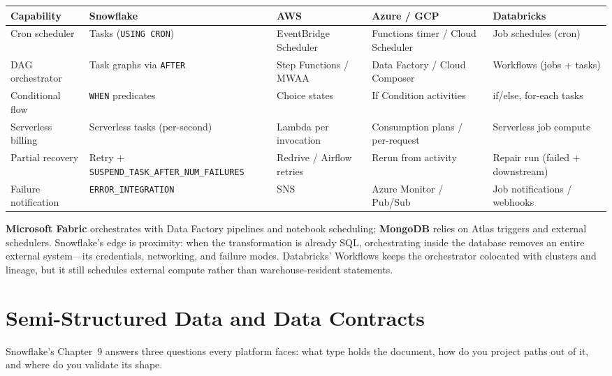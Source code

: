 \begin{center}
\footnotesize
\begin{tabular}{@{}p{2.5cm}p{2.9cm}p{2.7cm}p{2.9cm}p{2.9cm}@{}}
\toprule
\textbf{Capability} & \textbf{Snowflake} & \textbf{AWS} & \textbf{Azure / GCP} & \textbf{Databricks} \\
\midrule
Cron scheduler & Tasks (\texttt{USING CRON}) & EventBridge Scheduler & Functions timer / Cloud Scheduler & Job schedules (cron) \\
DAG orchestrator & Task graphs via \texttt{AFTER} & Step Functions / MWAA & Data Factory / Cloud Composer & Workflows (jobs + tasks) \\
Conditional flow & \texttt{WHEN} predicates & Choice states & If Condition activities & if/else, for-each tasks \\
Serverless billing & Serverless tasks (per-second) & Lambda per invocation & Consumption plans / per-request & Serverless job compute \\
Partial recovery & Retry + \texttt{SUSPEND\_TASK\_AFTER\_NUM\_FAILURES} & Redrive / Airflow retries & Rerun from activity & Repair run (failed + downstream) \\
Failure notification & \texttt{ERROR\_INTEGRATION} & SNS & Azure Monitor / Pub/Sub & Job notifications / webhooks \\
\bottomrule
\end{tabular}
\end{center}

\noindent \textbf{Microsoft Fabric} orchestrates with Data Factory pipelines and notebook
scheduling; \textbf{MongoDB} relies on Atlas triggers and external schedulers. Snowflake's edge
is proximity: when the transformation is already SQL, orchestrating inside the database removes
an entire external system---its credentials, networking, and failure modes. Databricks'
Workflows keeps the orchestrator colocated with clusters and lineage, but it still schedules
external compute rather than warehouse-resident statements.

\section{Semi-Structured Data and Data Contracts}
%
Snowflake's Chapter~9 answers three questions every platform faces: what type holds the document,
how do you project paths out of it, and where do you validate its shape.

